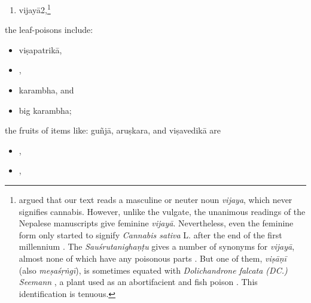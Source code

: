 \begin{translation}
\begin{itemize}
\begin{enumerate}
\item \gls{vijayā2},\footnote{\citet[61, n.\,3]{meul-sear} argued that our text
    reads a masculine or neuter noun \emph{vijaya}, which never signifies cannabis.
    However, unlike the vulgate, the unanimous readings of the Nepalese manuscripts
    give feminine \emph{vijayā}.  Nevertheless, even the feminine form only started to
    signify \emph{Cannabis sativa} L. after the end of the first millennium
    \citep{meul-sear,wuja-cann,mchu-2021}. The \emph{Sauśrutanighaṇṭu} gives 
    a 
    number
    of synonyms for \emph{vijayā}, almost none of which have any poisonous parts
    \citep[5.77, 10.143]{suve-2000}.  But one of them, \emph{viṣāṇī} (also
    \emph{meṣaśṛṅgī}), is sometimes equated with \emph{Dolichandrone falcata (DC.)
    Seemann} \citep[518]{adps}, a plant used as an abortifacient and fish poison
    \citep[\#862]{NK}.  This identification is tenuous.} 
        \end{enumerate}
        \end{itemize}
    
        \item
        the leaf-poisons include:
             \begin{itemize}            
        \item \gls{viṣapatrikā},
        \item {},
        \item \gls{karambha},
        and
        \item big \gls{karambha};
            \end{itemize}

        \item
        the fruits of items like:
        \gls{guñjā},
        \gls{aruṣkara},
        and
        \gls{viṣavedikā}
        are
                    \begin{itemize}
         \item {},	
         
        \item {},%


\end{itemize}
\end{translation}

